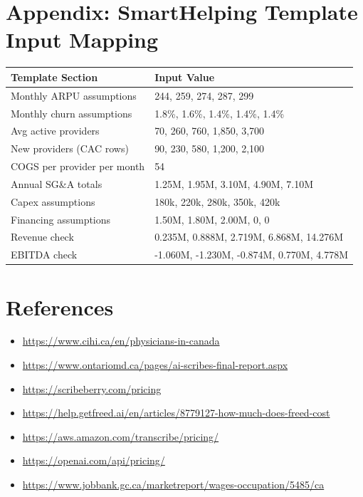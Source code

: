 \documentclass[11pt]{article}
\begin{document}
\section*{Appendix: SmartHelping Template Input Mapping}
\begin{center}
\begin{tabular}{p{} p{}}
\toprule
\textbf{Template Section} & \textbf{Input Value} \\
\midrule
Monthly ARPU assumptions & 244, 259, 274, 287, 299 \\
Monthly churn assumptions & 1.8\%, 1.6\%, 1.4\%, 1.4\%, 1.4\% \\
Avg active providers & 70, 260, 760, 1,850, 3,700 \\
New providers (CAC rows) & 90, 230, 580, 1,200, 2,100 \\
COGS per provider per month & 54 \\
Annual SG\&A totals & 1.25M, 1.95M, 3.10M, 4.90M, 7.10M \\
Capex assumptions & 180k, 220k, 280k, 350k, 420k \\
Financing assumptions & 1.50M, 1.80M, 2.00M, 0, 0 \\
Revenue check & 0.235M, 0.888M, 2.719M, 6.868M, 14.276M \\
EBITDA check & -1.060M, -1.230M, -0.874M, 0.770M, 4.778M \\
\bottomrule
\end{tabular}
\end{center}

\section*{References}
\begin{itemize}
\item \url{https://www.cihi.ca/en/physicians-in-canada}
\item \url{https://www.ontariomd.ca/pages/ai-scribes-final-report.aspx}
\item \url{https://scribeberry.com/pricing}
\item \url{https://help.getfreed.ai/en/articles/8779127-how-much-does-freed-cost}
\item \url{https://aws.amazon.com/transcribe/pricing/}
\item \url{https://openai.com/api/pricing/}
\item \url{https://www.jobbank.gc.ca/marketreport/wages-occupation/5485/ca}
\end{itemize}
\end{document}
